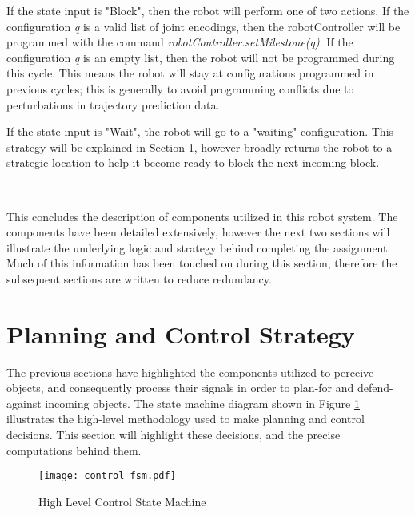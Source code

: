 \documentclass{article}
\begin{document}
If the state input is "Block", then the robot will perform one of two actions. If the configuration \emph{q} is a valid list of joint encodings, then the robotController will be programmed with the command \emph{robotController.setMilestone(q)}. If the configuration \emph{q} is an empty list, then the robot will not be programmed during this cycle. This means the robot will stay at configurations programmed in previous cycles; this is generally to avoid programming conflicts due to perturbations in trajectory prediction data. \par 

If the state input is "Wait", the robot will go to a "waiting" configuration. This strategy will be explained in Section \ref{sec:planningcontrol}, however broadly returns the robot to a strategic location to help it become ready to block the next incoming block. \par ~ \par 

This concludes the description of components utilized in this robot system. The components have been detailed extensively, however the next two sections will illustrate the underlying logic and strategy behind completing the assignment. Much of this information has been touched on during this section, therefore the subsequent sections are written to reduce redundancy.



\section{Planning and Control Strategy} \label{sec:planningcontrol}
The previous sections have highlighted the components utilized to perceive objects, and consequently process their signals in order to plan-for and defend-against incoming objects. The state machine diagram shown in Figure \ref{fig:control_fsm} illustrates the high-level methodology used to make planning and control decisions. This section will highlight these decisions, and the precise computations behind them.

\begin{figure}[h]
\begin{center}
\texttt{[image: control\_fsm.pdf]}
\caption{\label{fig:control_fsm} High Level Control State Machine}
\end{center}
\end{figure}

\end{document}
